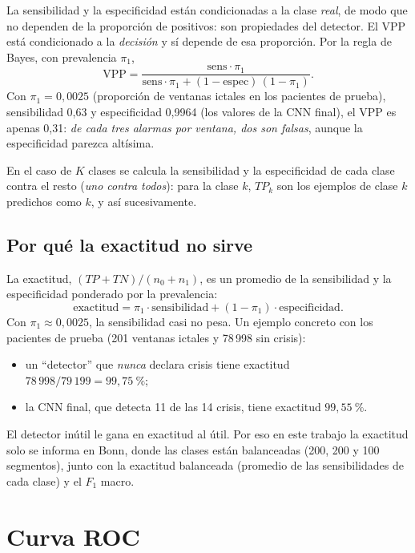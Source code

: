 La sensibilidad y la especificidad están condicionadas a la clase \emph{real}, de modo que no dependen de la proporción
de positivos: son propiedades del detector. El VPP está condicionado a la \emph{decisión} y sí depende de esa
proporción. Por la regla de Bayes, con prevalencia $\pi_1$,
\begin{equation}
  \text{VPP} = \frac{\text{sens}\cdot\pi_1}{\text{sens}\cdot\pi_1 + (1 - \text{espec})\,(1 - \pi_1)}.
  \label{eq:vpp_bayes}
\end{equation}
Con $\pi_1 = 0{,}0025$ (proporción de ventanas ictales en los pacientes de prueba), sensibilidad 0,63 y
especificidad 0,9964 (los valores de la CNN final), el VPP es apenas 0,31: \emph{de cada tres alarmas por ventana,
dos son falsas}, aunque la especificidad parezca altísima.

En el caso de $K$ clases se calcula la sensibilidad y la especificidad de cada clase contra el resto (\emph{uno contra
todos}): para la clase $k$, $TP_k$ son los ejemplos de clase $k$ predichos como $k$, y así sucesivamente.

\subsection{Por qué la exactitud no sirve}
\label{sec:accuracy}

La exactitud, $(TP + TN)/(n_0 + n_1)$, es un promedio de la sensibilidad y la especificidad ponderado por la
prevalencia:
\begin{equation}
  \text{exactitud} = \pi_1\cdot\text{sensibilidad} + (1 - \pi_1)\cdot\text{especificidad}.
\end{equation}
Con $\pi_1 \approx 0{,}0025$, la sensibilidad casi no pesa. Un ejemplo concreto con los pacientes de prueba (201 ventanas
ictales y 78\,998 sin crisis):
\begin{itemize}
  \item un ``detector'' que \emph{nunca} declara crisis tiene exactitud $78\,998/79\,199 = 99{,}75~\%$;
  \item la CNN final, que detecta 11 de las 14 crisis, tiene exactitud $99{,}55~\%$.
\end{itemize}
El detector inútil le gana en exactitud al útil. Por eso en este trabajo la exactitud solo se informa en Bonn, donde
las clases están balanceadas (200, 200 y 100 segmentos), junto con la exactitud balanceada (promedio de las
sensibilidades de cada clase) y el $F_1$ macro.

\section{Curva ROC}
\label{sec:roc}

